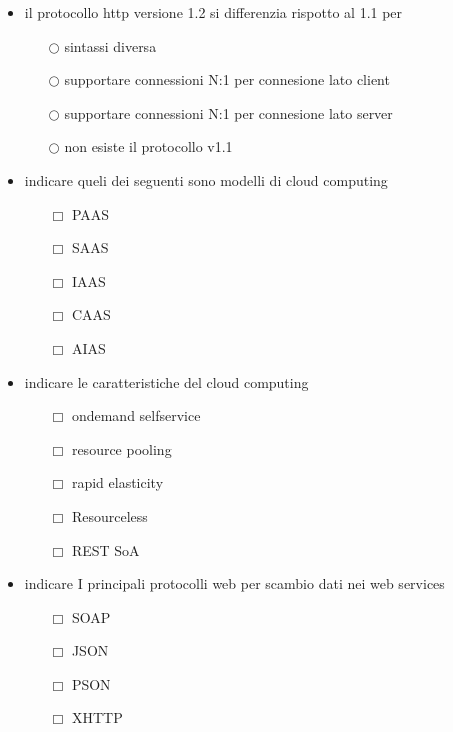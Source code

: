 \documentclass[10pt,twocolumn]{article}
\begin{document}
\begin{itemize}
    \item il protocollo http versione 1.2 si differenzia rispotto al 1.1 per
          \begin{itemize}
              \item[$\bigcirc$] sintassi diversa
              \item[$\bigcirc$] supportare connessioni N:1 per connesione lato client
              \item[$\bigcirc$] supportare connessioni N:1 per connesione lato server
              \item[$\bigcirc$] non esiste il protocollo v1.1
          \end{itemize}
\end{itemize}
\begin{itemize}
    \item indicare queli dei seguenti sono modelli di cloud computing
          \begin{itemize}
              \item[$\Box$] PAAS
              \item[$\Box$] SAAS
              \item[$\Box$] IAAS
              \item[$\Box$] CAAS
              \item[$\Box$] AIAS
          \end{itemize}
\end{itemize}
\begin{itemize}
    \item indicare le caratteristiche del cloud computing
          \begin{itemize}
              \item[$\Box$] ondemand selfservice
              \item[$\Box$] resource pooling
              \item[$\Box$] rapid elasticity
              \item[$\Box$] Resourceless
              \item[$\Box$] REST SoA
          \end{itemize}
\end{itemize}
\begin{itemize}
    \item indicare I principali protocolli web per scambio dati nei web services
          \begin{itemize}
              \item[$\Box$] SOAP
              \item[$\Box$] JSON
              \item[$\Box$] PSON
              \item[$\Box$] XHTTP
          \end{itemize}
\end{itemize}
\end{document}
